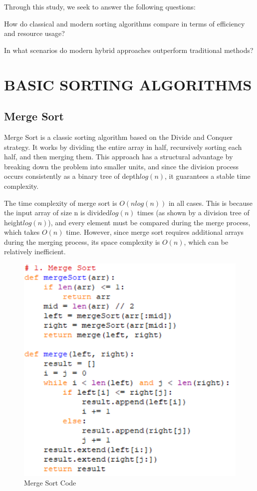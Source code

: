 \documentclass[sigconf]{acmart}
\begin{document}
Through this study, we seek to answer the following questions:

How do classical and modern sorting algorithms compare in terms of efficiency and resource usage?

In what scenarios do modern hybrid approaches outperform traditional methods?

\section{BASIC SORTING ALGORITHMS}
\subsection{Merge Sort}
Merge Sort is a classic sorting algorithm based on the Divide and Conquer strategy. It works by dividing the entire array in half, recursively sorting each half, and then merging them. This approach has a structural advantage by breaking down the problem into smaller units, and since the division process occurs consistently as a binary tree of depth$log(n)$, it guarantees a stable time complexity.

The time complexity of merge sort is $O(nlog(n))$ in all cases. This is because the input array of size n is divided$log(n)$ times (as shown by a division tree of height$log(n)$), and every element must be compared during the merge process, which takes $O(n)$ time. However, since merge sort requires additional arrays during the merging process, its space complexity is $O(n)$, which can be relatively inefficient.

\begin{figure}[H]
\centering
\includegraphics[width=0.85\linewidth]{figures/001.pdf}
\vspace{-0.3cm}
\caption{Merge Sort Code}  
\vspace{-0.35cm}
\label{fig:proportion}
\end{figure}
\end{document}
